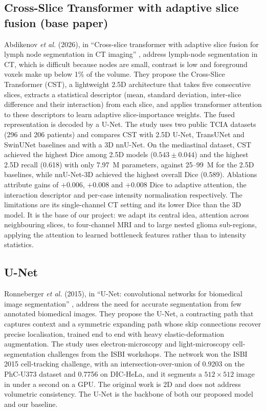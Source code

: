 \subsection{Cross-Slice Transformer with adaptive slice fusion (base paper)}
Abdikenov \emph{et al.} (2026), in ``Cross-slice transformer with adaptive slice fusion for lymph node segmentation in CT imaging'' \cite{abdikenov2026}, address lymph-node segmentation in CT, which is difficult because nodes are small, contrast is low and foreground voxels make up below 1\% of the volume. They propose the Cross-Slice Transformer (CST), a lightweight 2.5D architecture that takes five consecutive slices, extracts a statistical descriptor (mean, standard deviation, inter-slice difference and their interaction) from each slice, and applies transformer attention to these descriptors to learn adaptive slice-importance weights. The fused representation is decoded by a U-Net. The study uses two public TCIA datasets (296 and 206 patients) and compares CST with 2.5D U-Net, TransUNet and SwinUNet baselines and with a 3D nnU-Net. On the mediastinal dataset, CST achieved the highest Dice among 2.5D models ($0.543 \pm 0.044$) and the highest 2.5D recall (0.618) with only 7.97~M parameters, against 25--99~M for the 2.5D baselines, while nnU-Net-3D achieved the highest overall Dice (0.589). Ablations attribute gains of $+0.006$, $+0.008$ and $+0.008$ Dice to adaptive attention, the interaction descriptor and per-case intensity normalisation respectively. The limitations are its single-channel CT setting and its lower Dice than the 3D model. It is the base of our project: we adapt its central idea, attention across neighbouring slices, to four-channel MRI and to large nested glioma sub-regions, applying the attention to learned bottleneck features rather than to intensity statistics.

\subsection{U-Net}
Ronneberger \emph{et al.} (2015), in ``U-Net: convolutional networks for biomedical image segmentation'' \cite{ronneberger2015}, address the need for accurate segmentation from few annotated biomedical images. They propose the U-Net, a contracting path that captures context and a symmetric expanding path whose skip connections recover precise localisation, trained end to end with heavy elastic-deformation augmentation. The study uses electron-microscopy and light-microscopy cell-segmentation challenges from the ISBI workshops. The network won the ISBI 2015 cell-tracking challenge, with an intersection-over-union of 0.9203 on the PhC-U373 dataset and 0.7756 on DIC-HeLa, and it segments a $512 \times 512$ image in under a second on a GPU. The original work is 2D and does not address volumetric consistency. The U-Net is the backbone of both our proposed model and our baseline.

